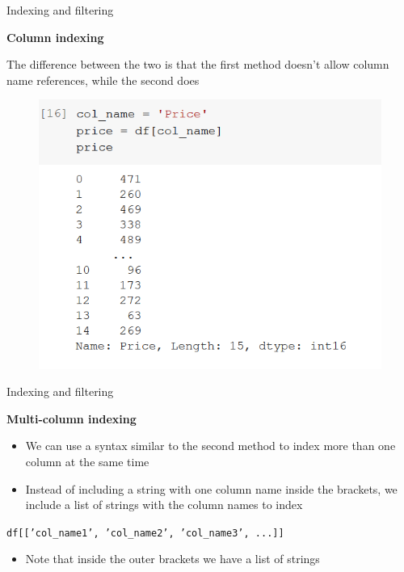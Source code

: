 \documentclass[aspectratio=169]{beamer}
\begin{document}
\begin{frame}{Indexing and filtering}

	\textbf{Column indexing}

	The difference between the two is that the first method doesn't allow column name references, while the second does
	\begin{figure}
		\centering
		\includegraphics[width=0.47\linewidth]{img/col_name_reference.png}
	\end{figure}

\end{frame}

\begin{frame}{Indexing and filtering}

	\textbf{Multi-column indexing}

	\begin{itemize}
		\item We can use a syntax similar to the second method to index more than one column at the same time
		\item Instead of including a string with one column name inside the brackets, we include a list of strings with the column names to index
	\end{itemize}

	\hspace{7mm} \texttt{df[['col\_name1', 'col\_name2', 'col\_name3', ...]]}

	\begin{itemize}
		\item Note that inside the outer brackets we have a list of strings
	\end{itemize}

\end{frame}
\end{document}
